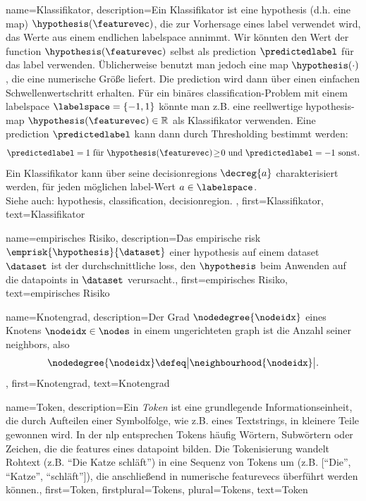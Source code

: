 {{
{name={Klassifikator},
description={Ein Klassifikator ist eine \gls{hypothesis} (d.h. eine \gls{map}) $\hypothesis(\featurevec)$, 
		die zur Vorhersage eines \gls{label} verwendet wird, das Werte aus einem endlichen \gls{labelspace} annimmt. 
		Wir könnten den Wert der \gls{function} $\hypothesis(\featurevec)$ selbst als \gls{prediction} $\predictedlabel$ für 
		das \gls{label} verwenden. Üblicherweise benutzt man jedoch eine \gls{map} $\hypothesis(\cdot)$, die eine 
		numerische Größe liefert. Die \gls{prediction} wird dann über einen einfachen Schwellenwertschritt erhalten. 
		Für ein binäres \gls{classification}-Problem mit einem \gls{labelspace} $\labelspace = \{-1,1\}$ 
		könnte man z.B. eine reellwertige \gls{hypothesis}-\gls{map} $\hypothesis(\featurevec) \in \mathbb{R}$ als Klassifikator verwenden. 
		Eine \gls{prediction} $\predictedlabel$ kann dann durch Thresholding bestimmt werden:
		 \begin{equation} 
		 	\label{equ_def_threshold_bin_classifier_dict}
		 	\predictedlabel =1   \mbox{ für } \hypothesis(\featurevec)\!\geq\!0 \mbox{ und } 	\predictedlabel =-1  \mbox{ sonst.}
	 		\end{equation}
		Ein Klassifikator kann über seine \glspl{decisionregion} $\decreg{a}$ charakterisiert werden, 
		für jeden möglichen \gls{label}-Wert $a \in \labelspace$.
					\\ 
		Siehe auch: \gls{hypothesis}, \gls{classification}, \gls{decisionregion}. },
first={Klassifikator},
text={Klassifikator} 
}


{
	name={empirisches Risiko},
	description={Das empirische \gls{risk} 
		$\emprisk{\hypothesis}{\dataset}$ einer \gls{hypothesis} auf einem 
		\gls{dataset} $\dataset$ ist der durchschnittliche \gls{loss}, 
		den $\hypothesis$ beim Anwenden auf die \gls{datapoint}s in $\dataset$ verursacht.},
	first={empirisches Risiko}, text={empirisches Risiko}
}

{
	name={Knoten­grad},
	description={Der Grad $\nodedegree{\nodeidx}$ eines Knotens 
		$\nodeidx \in \nodes$ in einem ungerichteten \gls{graph} ist die Anzahl seiner 
		\gls{neighbors}, also 
		\[
		\nodedegree{\nodeidx} \defeq \big| \neighbourhood{\nodeidx} \big|.
		\]},
	first={Knotengrad}, text={Knotengrad}
}

{name={Token},
description={Ein \textit{Token} ist eine grundlegende Informationseinheit, 
	die durch Aufteilen einer Symbolfolge, wie z.B. eines Textstrings, 
	in kleinere Teile gewonnen wird. In der \gls{nlp} entsprechen Tokens 
	häufig Wörtern, Subwörtern oder Zeichen, die die \glspl{feature} 
	eines \gls{datapoint} bilden. Die Tokenisierung wandelt Rohtext 
	(z.B. ``Die Katze schläft'') in eine Sequenz von Tokens um 
	(z.B. [``Die'', ``Katze'', ``schläft'']), die anschließend in numerische 
	\glspl{featurevec} überführt werden können.}, 
first={Token}, 
firstplural={Tokens}, 
plural={Tokens}, 
text={Token}
}

}}
